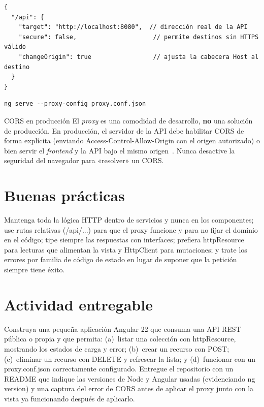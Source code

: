 \documentclass[11pt,a4paper]{article}
\newcommand{\code}[1]{{\ttfamily\color{ngdark}#1}}
\begin{document}
\begin{lstlisting}[caption={\texttt{proxy.conf.json} --- redirige /api hacia la API real.},label={lst:proxy}]
{
  "/api": {
    "target": "http://localhost:8080",  // dirección real de la API
    "secure": false,                     // permite destinos sin HTTPS válido
    "changeOrigin": true                 // ajusta la cabecera Host al destino
  }
}
\end{lstlisting}

\begin{lstlisting}[caption={Arrancar el servidor con el proxy.},label={lst:proxyrun}]
ng serve --proxy-config proxy.conf.json
\end{lstlisting}

\begin{concepto}{CORS en producción}
	El \emph{proxy} es una comodidad de desarrollo, \textbf{no} una solución de producción. En producción, el servidor de la API debe habilitar CORS de forma explícita (enviando \code{Access-Control-Allow-Origin} con el origen autorizado) o bien servir el \emph{frontend} y la API bajo el mismo origen~\cite{mdncors,whatwgfetch}. Nunca desactive la seguridad del navegador para «resolver» un CORS.
\end{concepto}

\section{Buenas prácticas}

Mantenga toda la lógica HTTP dentro de servicios y nunca en los componentes; use rutas relativas (\code{/api/...}) para que el proxy funcione y para no fijar el dominio en el código; tipe siempre las respuestas con interfaces; prefiera \code{httpResource} para lecturas que alimentan la vista y \code{HttpClient} para mutaciones; y trate los errores por familia de código de estado en lugar de suponer que la petición siempre tiene éxito.

\section{Actividad entregable}

Construya una pequeña aplicación Angular 22 que consuma una API REST pública o propia y que permita: (a)~listar una colección con \code{httpResource}, mostrando los estados de carga y error; (b)~crear un recurso con \code{POST}; (c)~eliminar un recurso con \code{DELETE} y refrescar la lista; y (d)~funcionar con un \code{proxy.conf.json} correctamente configurado. Entregue el repositorio con un \code{README} que indique las versiones de Node y Angular usadas (evidenciando \code{ng version}) y una captura del error de CORS antes de aplicar el proxy junto con la vista ya funcionando después de aplicarlo.
\end{document}
